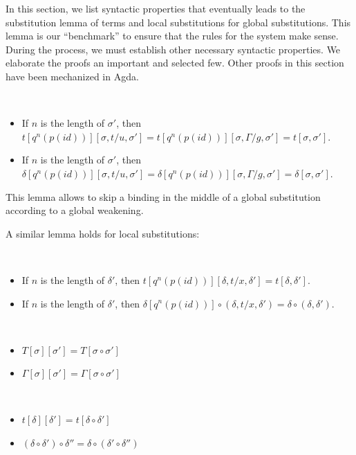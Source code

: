 In this section, we list syntactic properties that eventually leads to the
substitution lemma of terms and local substitutions for global substitutions. %
This lemma is our ``benchmark'' to ensure that the rules for the system make sense. %
During the process, we must establish other necessary syntactic properties. %
We elaborate the proofs an important and selected few. %
Other proofs in this section have been mechanized in Agda.

\begin{lemma} $ $
  \begin{itemize}
  \item If $n$ is the length of $\sigma'$, then $t [q^n(p(id))][\sigma,t/u,\sigma'] =
    t [q^n(p(id))][\sigma,\Gamma/g,\sigma'] = t[\sigma,\sigma']$.
  \item If $n$ is the length of $\sigma'$, then $\delta [q^n(p(id))][\sigma,t/u,\sigma'] =
    \delta [q^n(p(id))][\sigma,\Gamma/g,\sigma'] = \delta[\sigma,\sigma']$.
  \end{itemize}
\end{lemma}
This lemma allows to skip a binding in the middle of a global substitution according
to a global weakening.

A similar lemma holds for local substitutions:
\begin{lemma} $ $
  \begin{itemize}
  \item If $n$ is the length of $\delta'$, then $t [q^n(p(id))][\delta,t/x,\delta'] =
    t[\delta,\delta']$.
  \item If $n$ is the length of $\delta'$, then $\delta [q^n(p(id))] \circ (\delta,t/x,\delta') =
    \delta \circ (\delta,\delta')$.
  \end{itemize}
\end{lemma}


\begin{lemma}$ $
  \begin{itemize}
  \item $T[\sigma][\sigma'] = T[\sigma \circ \sigma']$
  \item $\Gamma[\sigma][\sigma'] = \Gamma[\sigma \circ \sigma']$
  \end{itemize}
\end{lemma}

\begin{lemma} $ $
  \begin{itemize}
  \item $t[\delta][\delta'] = t[\delta \circ \delta']$
  \item $(\delta \circ \delta') \circ \delta'' = \delta \circ (\delta' \circ \delta'')$
  \end{itemize}
\end{lemma}

